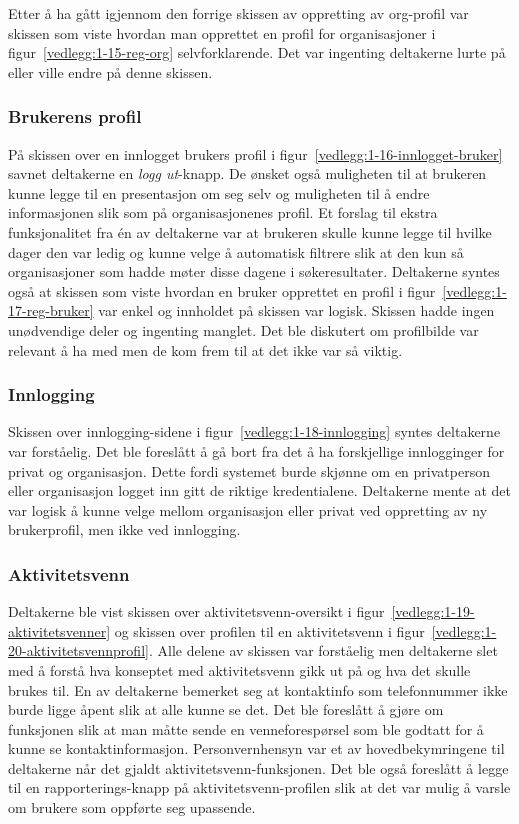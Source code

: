 Etter å ha gått igjennom den forrige skissen av oppretting av org-profil var skissen som viste hvordan man opprettet en profil for organisasjoner i figur~\ref{vedlegg:1-15-reg-org} selvforklarende. Det var ingenting deltakerne lurte på eller ville endre på denne skissen.

\subsubsection{Brukerens profil}

På skissen over en innlogget brukers profil i figur~\ref{vedlegg:1-16-innlogget-bruker} savnet deltakerne en {\em  logg ut}-knapp. De ønsket også muligheten til at brukeren kunne legge til en presentasjon om seg selv og muligheten til å endre informasjonen slik som på organisasjonenes profil. Et forslag til ekstra funksjonalitet fra én av deltakerne var at brukeren skulle kunne legge til hvilke dager den var ledig og kunne velge å automatisk filtrere slik at den kun så organisasjoner som hadde møter disse dagene i søkeresultater.
Deltakerne syntes også at skissen som viste hvordan en bruker opprettet en profil i figur~\ref{vedlegg:1-17-reg-bruker} var enkel og innholdet på skissen var logisk. Skissen hadde ingen unødvendige deler og ingenting manglet. Det ble diskutert om profilbilde var relevant å ha med men de kom frem til at det ikke var så viktig. 


\subsubsection{Innlogging}

Skissen over innlogging-sidene i figur~\ref{vedlegg:1-18-innlogging} syntes deltakerne var forståelig. Det ble foreslått å gå bort fra det å ha forskjellige innlogginger for privat og organisasjon. Dette fordi systemet burde skjønne om en privatperson eller organisasjon logget inn gitt de riktige kredentialene. Deltakerne mente at det var logisk å kunne velge mellom organisasjon eller privat ved oppretting av ny brukerprofil, men ikke ved innlogging.


\subsubsection{Aktivitetsvenn}

Deltakerne ble vist skissen over aktivitetsvenn-oversikt i figur~\ref{vedlegg:1-19-aktivitetsvenner} og skissen over profilen til en aktivitetsvenn i figur~\ref{vedlegg:1-20-aktivitetsvennprofil}. Alle delene av skissen var forståelig men deltakerne slet med å forstå hva konseptet med aktivitetsvenn gikk ut på og hva det skulle brukes til. En av deltakerne bemerket seg at kontaktinfo som telefonnummer ikke burde ligge åpent slik at alle kunne se det. Det ble foreslått å gjøre om funksjonen slik at man måtte sende en venneforespørsel som ble godtatt for å kunne se kontaktinformasjon. Personvernhensyn var et av hovedbekymringene til deltakerne når det gjaldt aktivitetsvenn-funksjonen. Det ble også foreslått å legge til en rapporterings-knapp på aktivitetsvenn-profilen slik at det var mulig å varsle om brukere som oppførte seg upassende.

